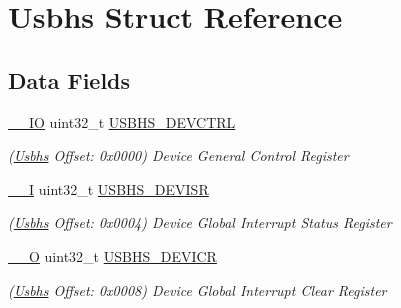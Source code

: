 \hypertarget{structUsbhs}{}\section{Usbhs Struct Reference}
\label{structUsbhs}
\subsection*{Data Fields}
\begin{DoxyCompactItemize}
\item 
\mbox{\label{structUsbhs_a66f7db5ff419e8dc19e738ddb1edad43}} 
\mbox{\hyperlink{core__cm7_8h_aec43007d9998a0a0e01faede4133d6be}{\+\_\+\+\_\+\+IO}} uint32\+\_\+t \mbox{\hyperlink{structUsbhs_a66f7db5ff419e8dc19e738ddb1edad43}{U\+S\+B\+H\+S\+\_\+\+D\+E\+V\+C\+T\+RL}}
\begin{DoxyCompactList}\small\item\em (\mbox{\hyperlink{structUsbhs}{Usbhs}} Offset\+: 0x0000) Device General Control Register \end{DoxyCompactList}\item 
\mbox{\label{structUsbhs_a2daf34a1200aa8d50da9705563324030}} 
\mbox{\hyperlink{core__cm7_8h_af63697ed9952cc71e1225efe205f6cd3}{\+\_\+\+\_\+I}} uint32\+\_\+t \mbox{\hyperlink{structUsbhs_a2daf34a1200aa8d50da9705563324030}{U\+S\+B\+H\+S\+\_\+\+D\+E\+V\+I\+SR}}
\begin{DoxyCompactList}\small\item\em (\mbox{\hyperlink{structUsbhs}{Usbhs}} Offset\+: 0x0004) Device Global Interrupt Status Register \end{DoxyCompactList}\item 
\mbox{\label{structUsbhs_aae85fedce405bedc16a23427a1ee375e}} 
\mbox{\hyperlink{core__cm7_8h_a7e25d9380f9ef903923964322e71f2f6}{\+\_\+\+\_\+O}} uint32\+\_\+t \mbox{\hyperlink{structUsbhs_aae85fedce405bedc16a23427a1ee375e}{U\+S\+B\+H\+S\+\_\+\+D\+E\+V\+I\+CR}}
\begin{DoxyCompactList}\small\item\em (\mbox{\hyperlink{structUsbhs}{Usbhs}} Offset\+: 0x0008) Device Global Interrupt Clear Register \end{DoxyCompactList}\item 
\mbox{\label{structUsbhs_a645e27f23e778bd26cf1282a7009fa00}} 

\end{DoxyCompactItemize}
